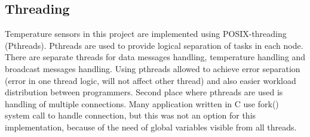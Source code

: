 \subsection{Threading}
\label{subsec:threading}
Temperature sensors in this project are implemented using POSIX-threading (Pthreads). Pthreads are used to provide logical separation of tasks in each node. There are separate threads for data messages handling, temperature handling and broadcast messages handling. Using pthreads allowed to achieve error separation (error in one thread logic, will not affect other thread) and also easier workload distribution between programmers. Second place where pthreads are used is handling of multiple connections. Many application written in C use fork() system call to handle connection, but this was not an option for this implementation, because of the need of global variables visible from all threads.
\label{subsec:msgpass}
